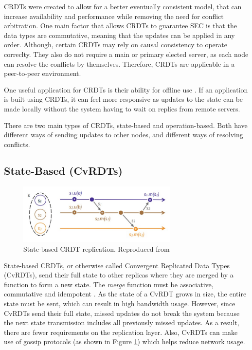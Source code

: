\documentclass[12pt]{report}
\begin{document}
CRDTs were created to allow for a better eventually consistent model, that can increase availability and performance while removing the need for conflict arbitration.  One main factor that allows CRDTs to guarantee SEC is that the data types are commutative\cite{10.1007/978-3-642-24550-3_29}, meaning that the updates can be applied in any order. Although, certain CRDTs may rely on causal consistency to operate correclty. They also do not require a main or primary elected server, as each node can resolve the conflicts by themselves. Therefore, CRDTs are applicable in a peer-to-peer environment. \par
One useful application for CRDTs is their ability for offline use \cite{10.1145/3359591.3359737}. If an application is built using CRDTs, it can feel more responsive as updates to the state can be made locally without the system having to wait on replies from remote servers. \par
There are two main types of CRDTs, state-based and operation-based. Both have different ways of sending updates to other nodes, and different ways of resolving conflicts. \par


\subsection{State-Based (CvRDTs)}

\begin{figure}
    \centering
    \includegraphics[width=8cm]{images/state.jpg}
    \caption{State-based CRDT replication. Reproduced from \cite{10.1007/978-3-642-24550-3_29}}
    \label{fig:statebased}
\end{figure}

State-based CRDTs, or otherwise called Convergent Replicated Data Types (CvRDTs), send their full state to other replicas where they are merged by a function to form a new state. The \textit{merge} function must be associative, commutative and idempotent \cite{10.1007/978-3-642-24550-3_29}. As the state of a CvRDT grows in size, the entire state must be sent, which can result in high bandwidth usage. However, since CvRDTs send their full state, missed updates do not break the system because the next state transmission includes all previously missed updates. As a result, there are fewer requirements on the replication layer. Also, CvRDTs can make use of gossip protocols (as shown in Figure \ref{fig:statebased}) which helps reduce network usage. \par
\end{document}
